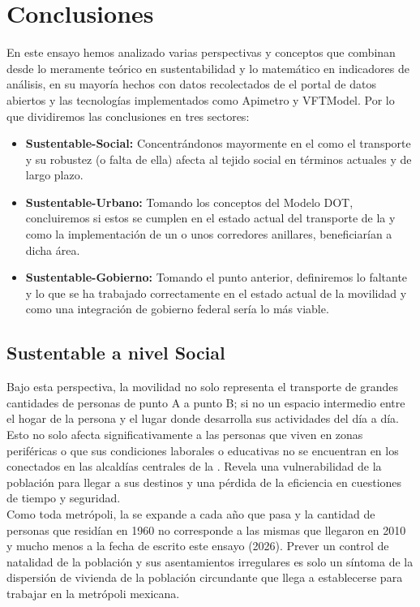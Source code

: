 
\section{Conclusiones}

En este ensayo hemos analizado varias perspectivas y conceptos que combinan desde lo 
meramente teórico en sustentabilidad y lo matemático en indicadores de análisis, 
en su mayoría hechos con datos recolectados de el portal de datos abiertos y las tecnologías 
implementados como Apimetro y VFTModel. Por lo que dividiremos las conclusiones en tres sectores:

\begin{itemize}
    \item \textbf{Sustentable-Social:} Concentrándonos mayormente en el como el transporte y su 
        robustez (o falta de ella) afecta al tejido social en términos actuales y de largo plazo.            
    \item \textbf{Sustentable-Urbano:} Tomando los conceptos del Modelo DOT, concluiremos si estos 
        se cumplen en el estado actual del transporte de la \zmvm y como la implementación de un o 
        unos corredores anillares, beneficiarían a dicha área.
    \item \textbf{Sustentable-Gobierno:} Tomando el punto anterior, definiremos lo faltante y lo que 
        se ha trabajado correctamente en el estado actual de la movilidad y como una integración 
        de gobierno federal sería lo más viable.
\end{itemize} 
\subsection{Sustentable a nivel Social}

Bajo esta perspectiva, la movilidad no solo representa el transporte de grandes cantidades de personas de 
punto A a punto B; si no un espacio intermedio entre el hogar de la persona y el lugar donde desarrolla sus 
actividades del día a día. Esto no solo afecta significativamente a las personas que viven en zonas periféricas 
o que sus condiciones laborales o educativas no se encuentran en los  conectados en las alcaldías 
centrales de la \zmvm. Revela una vulnerabilidad de la población para llegar a sus destinos 
y una pérdida de la eficiencia en cuestiones de tiempo y seguridad. \\ Como toda metrópoli, la 
\zmvm se expande a cada año que pasa y la cantidad de personas que residían en 1960 no corresponde a las mismas 
que llegaron en 2010 y mucho menos a la fecha de escrito este ensayo (2026). Prever un control de natalidad de la 
población y sus asentamientos irregulares es solo un síntoma de la dispersión de vivienda de la población 
circundante que llega a establecerse para trabajar en la metrópoli mexicana.

